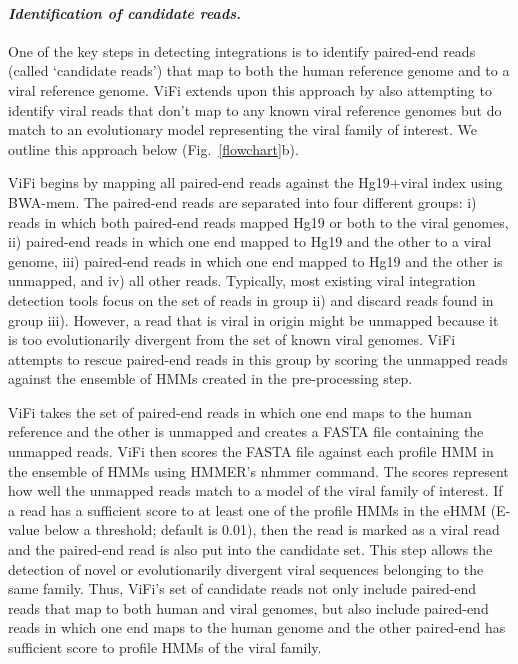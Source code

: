 \documentclass[a4,center,fleqn]{NAR}
\begin{document}
\paragraph{\emph{Identification of candidate reads.}}  
One of the key steps in detecting integrations is to identify paired-end
reads (called `candidate reads') that map to both the human reference genome and to a viral reference
genome.  ViFi extends upon this approach by also attempting to identify viral
reads that don't map to any known viral reference genomes but do match to an evolutionary model representing
the viral family of interest.  We outline this approach below (Fig.~\ref{flowchart}b).

ViFi begins by mapping all paired-end reads against the Hg19+viral index 
using BWA-mem.  The paired-end reads are separated into four
different groups: i) reads in which both paired-end reads mapped Hg19
or both to the viral genomes, ii) paired-end reads in which one end
mapped to Hg19 and the other to a viral genome, iii) paired-end reads
in which one end mapped to Hg19 and the other is unmapped, and iv) all
other reads.  Typically, most existing viral integration detection
tools focus on the set of reads in group ii) and discard reads
found in group iii).  However, a read that is viral in origin might be
unmapped because it is too evolutionarily divergent from the set of
known viral genomes.  ViFi attempts to rescue paired-end reads in this group 
by scoring the unmapped reads against the ensemble of HMMs created in the 
pre-processing step.   

ViFi takes the set of paired-end reads in which one end maps to the human reference and the other is unmapped and creates a FASTA file containing the unmapped reads.  ViFi then scores the FASTA file against each profile
HMM in the ensemble of HMMs using HMMER's nhmmer command.  The scores represent how well the unmapped reads
match to a model of the viral family of interest.  If a read has a sufficient
score to at least one of the profile HMMs in the eHMM (E-value below a threshold; default is 0.01),
then the read is marked as a viral read and the paired-end read is also put
into the candidate set.  This step allows the detection of novel or evolutionarily divergent viral
sequences belonging to the same family.  Thus, ViFi's set of candidate reads not only include paired-end reads that map to both human and viral genomes, but also include paired-end reads in which one end maps to the human genome and the other paired-end has sufficient score to profile HMMs of the viral family. 
\end{document}

